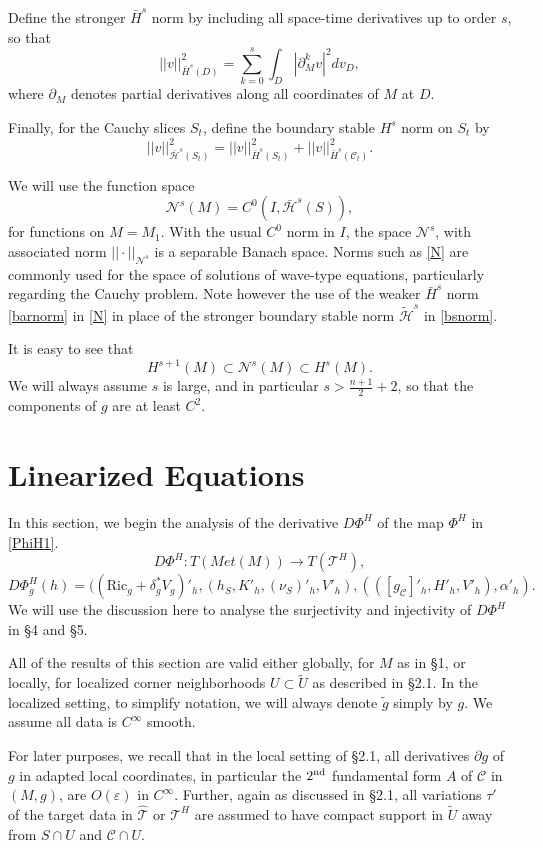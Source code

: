 \documentclass[10pt]{amsart}
\renewcommand{\a}{\alpha}
\renewcommand{\d}{\delta}
\newcommand{\e}{\varepsilon}
\newcommand{\cC}{{\mathcal C}}
\newcommand{\cT}{{\mathcal T}}
\newcommand{\cN}{{\mathcal N}}
\newcommand{\cH}{{\mathcal H}}
\newcommand{\Ric}{\mathrm{Ric}}
\newcommand{\be}{\begin{equation}}
\newcommand{\ee}{\end{equation}}
\newcommand{\p}{\partial}
\renewcommand{\to}{\rightarrow}
\renewcommand{\hat}{\widehat}
\newcommand{\<}{\langle}
\renewcommand{\>}{\rangle}
\newcommand{\w}{\widetilde}
\theoremstyle{plain}
\theoremstyle{remark}
\theoremstyle{definition}
\numberwithin{equation}{section}
\begin{document}
  Define the stronger $\bar H^s$ norm by including all space-time derivatives up to order $s$, so that 
\be \label{barnorm}  
||v||_{\bar H^s(D)}^2 = \sum_{k=0}^s \int_{D} |\p_M^k v|^2dv_D,
\ee
where $\p_M$ denotes partial derivatives along all coordinates of $M$ at $D$. 
 
  Finally, for the Cauchy slices $S_t$, define the boundary stable $H^s$ norm on $S_t$ by 
\be \label{bsnorm}
||v||_{\bar \cH^s(S_t)}^2 = ||v||_{\bar H^s(S_t)}^2 + ||v||_{\bar H^s(\cC_t)}^2.
\ee
  
  We will use the function space  
\be \label{N}
\cN^s(M) = C^0(I, \bar \cH^{s}(S)),
\ee
for functions on $M = M_1$. With the usual $C^0$ norm in $I$, the space $\cN^s$, with associated norm $|| \cdot ||_{\cN^s}$ is a 
separable Banach space. Norms such as \eqref{N} are commonly used for the space of solutions of wave-type equations, 
particularly regarding the Cauchy problem. Note however the use of the weaker $\bar H^s$ norm \eqref{barnorm} in \eqref{N} in 
place of the stronger boundary stable norm $\w \cH^s$ in \eqref{bsnorm}. 

 It is easy to see that 
$$H^{s+1}(M) \subset \cN^s(M) \subset H^s(M).$$
We will always assume $s$ is large, and in particular $s > \frac{n+1}{2} + 2$, so that the components of $g$ are at least $C^2$. 


 \section{Linearized Equations} 
 
   In this section, we begin the analysis of the derivative $D\Phi^H$ of the map $\Phi^H$ in \eqref{PhiH1}. 
\be \label{DPhiH}
D\Phi^H: T(Met(M)) \to T(\cT^H),
\ee
$$D\Phi_g^H(h) = ((\Ric_g + \d_g^* V_g)'_h, (h_S, K'_h, (\nu_S)'_h, V'_h), (([g_{\cC}]'_h, H'_{h}, V'_h), \a'_h).$$    
We will use the discussion here to analyse the surjectivity and injectivity of $D\Phi^H$ in \S 4 and \S 5. 
  
   All of the results of this section are valid either globally, for $M$ as in \S 1, or locally, for localized corner neighborhoods $U \subset \w U$ as 
described in \S 2.1. In the localized setting, to simplify notation, we will always denote $\w g$ simply by $g$. We assume all data is $C^{\infty}$ smooth. 

  For later purposes, we recall that in the local setting of \S 2.1, all derivatives $\p g$ of $g$ in adapted local coordinates, in particular the 
$2^{\rm nd}$ fundamental form $A$ of $\cC$ in $(M, g)$, are $O(\e)$ in $C^{\infty}$. Further, again as discussed in \S 2.1, all variations 
$\tau'$ of the target data in $\hat \cT$ or $\cT^H$ are assumed to have compact support in $\w U$ away from $S\cap U$ and $\cC \cap U$.
 
\end{document}
